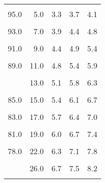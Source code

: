 \documentclass[
]{book}
\begin{document}
\begin{longtable}[t]{rrrrr}
\cellcolor{gray!6}{95.5} & \cellcolor{gray!6}{4.5} & \cellcolor{gray!6}{3.2} & \cellcolor{gray!6}{3.5} & \cellcolor{gray!6}{3.9}\\
95.0 & 5.0 & 3.3 & 3.7 & 4.1\\
\cellcolor{gray!6}{94.0} & \cellcolor{gray!6}{6.0} & \cellcolor{gray!6}{3.6} & \cellcolor{gray!6}{4.1} & \cellcolor{gray!6}{4.5}\\
93.0 & 7.0 & 3.9 & 4.4 & 4.8\\
\addlinespace
\cellcolor{gray!6}{92.0} & \cellcolor{gray!6}{8.0} & \cellcolor{gray!6}{4.1} & \cellcolor{gray!6}{4.6} & \cellcolor{gray!6}{5.1}\\
91.0 & 9.0 & 4.4 & 4.9 & 5.4\\
\cellcolor{gray!6}{90.0} & \cellcolor{gray!6}{10.0} & \cellcolor{gray!6}{4.6} & \cellcolor{gray!6}{5.1} & \cellcolor{gray!6}{5.6}\\
89.0 & 11.0 & 4.8 & 5.4 & 5.9\\
\cellcolor{gray!6}{88.0} & \cellcolor{gray!6}{12.0} & \cellcolor{gray!6}{5.0} & \cellcolor{gray!6}{5.6} & \cellcolor{gray!6}{6.1}\\
\addlinespace
87.0 & 13.0 & 5.1 & 5.8 & 6.3\\
\cellcolor{gray!6}{86.0} & \cellcolor{gray!6}{14.0} & \cellcolor{gray!6}{5.3} & \cellcolor{gray!6}{5.9} & \cellcolor{gray!6}{6.5}\\
85.0 & 15.0 & 5.4 & 6.1 & 6.7\\
\cellcolor{gray!6}{84.0} & \cellcolor{gray!6}{16.0} & \cellcolor{gray!6}{5.6} & \cellcolor{gray!6}{6.3} & \cellcolor{gray!6}{6.9}\\
83.0 & 17.0 & 5.7 & 6.4 & 7.0\\
\addlinespace
\cellcolor{gray!6}{82.0} & \cellcolor{gray!6}{18.0} & \cellcolor{gray!6}{5.9} & \cellcolor{gray!6}{6.6} & \cellcolor{gray!6}{7.2}\\
81.0 & 19.0 & 6.0 & 6.7 & 7.4\\
\cellcolor{gray!6}{80.0} & \cellcolor{gray!6}{20.0} & \cellcolor{gray!6}{6.1} & \cellcolor{gray!6}{6.8} & \cellcolor{gray!6}{7.5}\\
78.0 & 22.0 & 6.3 & 7.1 & 7.8\\
\cellcolor{gray!6}{76.0} & \cellcolor{gray!6}{24.0} & \cellcolor{gray!6}{6.5} & \cellcolor{gray!6}{7.3} & \cellcolor{gray!6}{8.0}\\
\addlinespace
74.0 & 26.0 & 6.7 & 7.5 & 8.2\\
\cellcolor{gray!6}{72.0} & \cellcolor{gray!6}{28.0} & \cellcolor{gray!6}{6.9} & \cellcolor{gray!6}{7.7} & \cellcolor{gray!6}{8.4}\\

\end{longtable}
\end{document}
